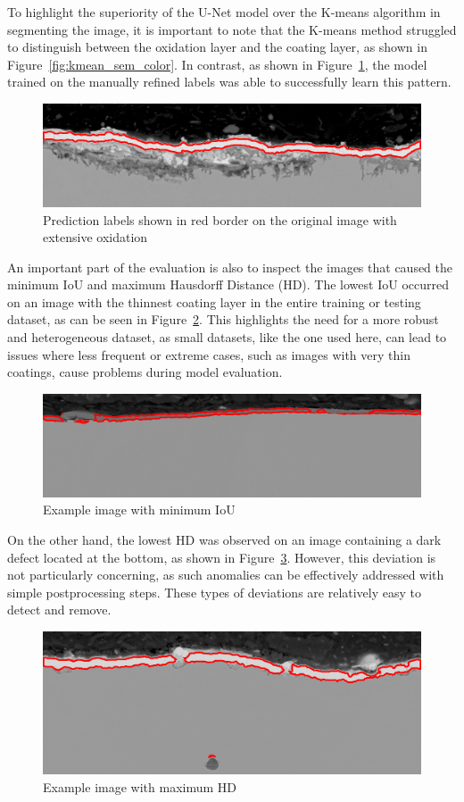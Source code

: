 



To highlight the superiority of the U-Net model over the K-means algorithm in segmenting the image, it is important to note that the K-means method struggled to distinguish between the oxidation layer and the coating layer, as shown in Figure~\ref{fig:kmean_sem_color}. In contrast, as shown in Figure~\ref{fig:149}, the model trained on the manually refined labels was able to successfully learn this pattern.

\begin{figure}[H] 
\centering 
\includegraphics[width=0.8\linewidth]{PICTURES/eval/149(1).png} 
\caption{Prediction labels shown in red border on the original image with extensive oxidation} \label{fig:149} \end{figure}

An important part of the evaluation is also to inspect the images that caused the minimum IoU and maximum Hausdorff Distance (HD). The lowest IoU occurred on an image with the thinnest coating layer in the entire training or testing dataset, as can be seen in Figure~\ref{fig:min_iou}. This highlights the need for a more robust and heterogeneous dataset, as small datasets, like the one used here, can lead to issues where less frequent or extreme cases, such as images with very thin coatings, cause problems during model evaluation.

 \begin{figure} [H]
    \centering 
    \includegraphics[width=0.70\linewidth]{PICTURES/eval/66.png} \caption{Example image with minimum IoU} \label{fig:min_iou}
 \end{figure}
On the other hand, the lowest HD was observed on an image containing a dark defect located at the bottom, as shown in Figure~\ref{fig:max_hd}. However, this deviation is not particularly concerning, as such anomalies can be effectively addressed with simple postprocessing steps. These types of deviations are relatively easy to detect and remove.
 \begin{figure}[H]
        \centering
        \includegraphics[width=0.65\linewidth]{PICTURES/eval/113.png}
        \caption{Example image with maximum HD}
        \label{fig:max_hd}
    \end{figure}



